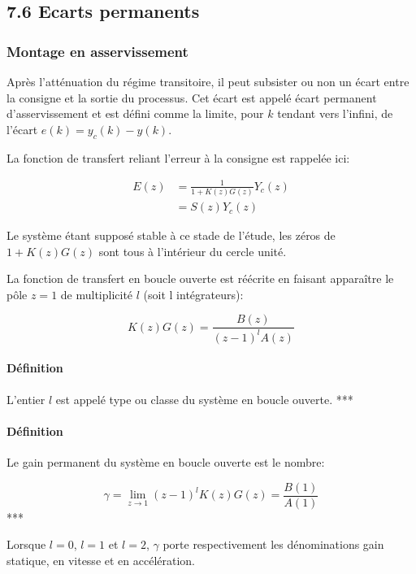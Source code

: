 \documentclass[11pt]{article}
\begin{document}
    \subsection{7.6 Ecarts permanents}\label{ecarts-permanents}

    \subsubsection{Montage en
asservissement}\label{montage-en-asservissement}

    Après l'atténuation du régime transitoire, il peut subsister ou non un
écart entre la consigne et la sortie du processus. Cet écart est appelé
écart permanent d'asservissement et est défini comme la limite, pour
\(k\) tendant vers l'infini, de l'écart \(e(k) = y_c(k) - y(k)\).

La fonction de transfert reliant l'erreur à la consigne est rappelée
ici:

\begin{align}
  E(z) &= \frac{1}{1+K(z)G(z)} Y_c(z) \\
       &= S(z) Y_c(z)
\end{align}

Le système étant supposé stable à ce stade de l'étude, les zéros de
\(1+K(z)G(z)\) sont tous à l'intérieur du cercle unité.

    La fonction de transfert en boucle ouverte est réécrite en faisant
apparaître le pôle \(z=1\) de multiplicité \(l\) (soit l intégrateurs):

\[ K(z)G(z) = \frac{B(z)}{(z-1)^l A(z)} \]

    \paragraph{Définition}\label{duxe9finition}

L'entier \(l\) est appelé type ou classe du système en boucle ouverte.
***

    \paragraph{Définition}\label{duxe9finition}

Le gain permanent du système en boucle ouverte est le nombre:

\[ \gamma = \lim_{z \rightarrow 1} (z-1)^l K(z)G(z) = \frac{B(1)}{A(1)} \]
***

    Lorsque \(l = 0\), \(l = 1\) et \(l = 2\), \(\gamma\) porte
respectivement les dénominations gain statique, en vitesse et en
accélération.
\end{document}
